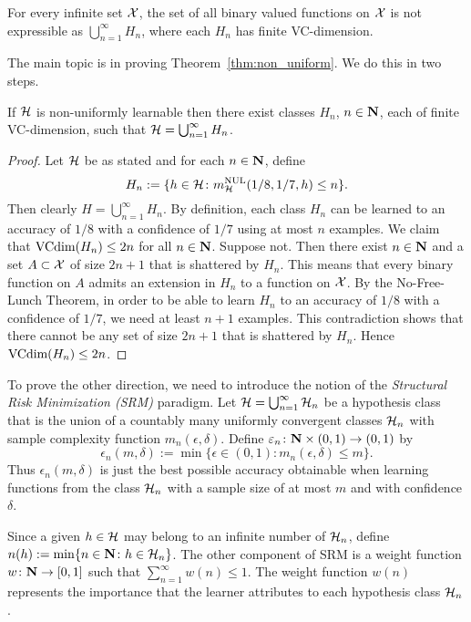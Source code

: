 \begin{lemma}\label{lemma:non_uniform}
For every infinite set $\mathcal{X}$, the set of all binary valued functions on $\mathcal{X}$ is
not expressible as $\bigcup_{n = 1}^{\infty} H_n$, where each $H_n$ has finite VC-dimension.
\end{lemma}

The main topic is in proving Theorem~\ref{thm:non_uniform}. We do this in two steps.
\begin{lemma}\label{lemma:if_side}
If $\mathcal{H}$ is non-uniformly learnable then there exist classes $H_n$, $n \in \mathbf{N}$, each
of finite VC-dimension, such that $\mathcal{H} = \bigcup_{n = 1}^{\infty} H_n$.
\end{lemma}
\begin{proof}
Let $\mathcal{H}$ be as stated and for each $n \in \mathbf{N}$, define
\[
    H_n := \{h \in \mathcal{H} \colon m_{\mathcal{H}}^{\text{NUL}} (1/8, 1/7, h) \leq n\}.
\]
Then clearly $H = \bigcup_{n = 1}^{\infty} H_n$. By definition, each class $H_n$
can be learned to an accuracy of $1/8$ with a confidence of $1/7$ using at most $n$
examples. We claim that $\text{VCdim} (H_n) \leq 2n$ for all
$n \in \mathbf{N}$. Suppose not. Then there exist $n \in \mathbf{N}$ and a set $A \subset \mathcal{X}$ of size
$2n + 1$ that is shattered by $H_n$. This means that every binary function on $A$ admits
an extension in $H_n$ to a function on $\mathcal{X}$. By the No-Free-Lunch Theorem, in order
to be able to learn $H_n$ to an accuracy of $1/8$ with a confidence of $1/7$, we need
at least $n + 1$ examples. This contradiction shows that there cannot be any set
of size $2n + 1$ that is shattered by $H_n$. Hence $\text{VCdim} (H_n) \leq 2n$.
\qedhere
\end{proof}


To prove the other direction, we need to introduce the notion of the \emph{Structural
Risk Minimization (SRM)} paradigm. Let $\mathcal{H} = \bigcup_{n = 1}^{\infty} \mathcal{H}_n$
be a hypothesis class that is the union of a countably many uniformly convergent
classes $\mathcal{H}_n$ with sample complexity function
$m_n (\epsilon, \delta)$. Define $\varepsilon_n \colon \mathbf{N} \times (0, 1) \rightarrow (0, 1)$
by
\[
    \epsilon_n (m, \delta) :=
        \min \{\epsilon \in (0, 1) \colon m_n (\epsilon, \delta) \leq m\}.
\]
Thus $\epsilon_n (m, \delta)$ is just the best possible accuracy obtainable
when learning functions from the class $\mathcal{H}_n$ with a sample size of
at most $m$ and with confidence $\delta$.

Since a given $h \in \mathcal{H}$ may belong to an infinite number of $\mathcal{H}_n$,
define $n(h) := \min \{n \in \mathbf{N} \colon h \in \mathcal{H}_n \}$. The other
component of SRM is a weight function $w \colon \mathbf{N} \rightarrow [0, 1]$ such
that $\sum_{n = 1}^{\infty} w(n) \leq 1$. The weight function $w(n)$ represents
the importance that the learner attributes to each hypothesis class $\mathcal{H}_n$.


